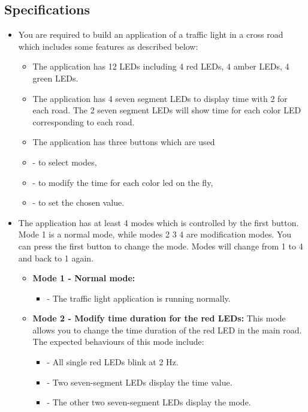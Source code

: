 \documentclass[a4paper,12pt]{article}
\begin{document}
\subsection{Specifications}
\begin{itemize}
	\item[] You are required to build an application of a traffic light in a cross road which includes
	some features as described below:
	\begin{itemize}
		\item[\textbullet] The application has 12 LEDs including 4 red LEDs, 4 amber LEDs, 4 green LEDs.
		\item[\textbullet] The application has 4 seven segment LEDs to display time with 2 for each road. The
		2 seven segment LEDs will show time for each color LED corresponding to each
		road.
		\item[\textbullet] The application has three buttons which are used
		\item[] \hspace{0.5cm} - to select modes,
		\item[] \hspace{0.5cm} - to modify the time for each color led on the fly,
		\item[] \hspace{0.5cm} - to set the chosen value.
	\end{itemize}
	\item[\textbullet] The application has at least 4 modes which is controlled by the first button. Mode 1 is a normal mode, while modes 2 3 4 are modification modes. You can press the
	first button to change the mode. Modes will change from 1 to 4 and back to 1 again.
	\begin{itemize}
		\item[] \textbf{Mode 1 - Normal mode:}
		\begin{itemize}
			\item[] - The traffic light application is running normally.
		\end{itemize}
		\item[] \textbf{Mode 2 - Modify time duration for the red LEDs:} This mode allows you to change the time duration of the red LED in the main road. The expected behaviours of this
		mode include:
		\begin{itemize}
			\item[] - All single red LEDs blink at 2 Hz.
			\item[] - Two seven-segment LEDs display the time value.
			\item[] - The other two seven-segment LEDs display the mode.

\end{itemize}
\end{itemize}
\end{itemize}
\end{document}
